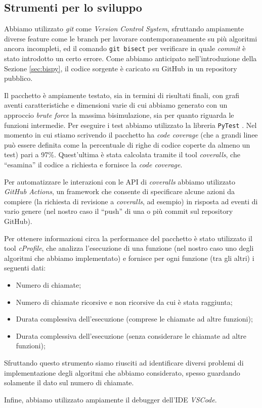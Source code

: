 \subsection{Strumenti per lo sviluppo}
Abbiamo utilizzato \emph{git} come \emph{Version Control System}, sfruttando ampiamente diverse feature come le branch per lavorare contemporaneamente su più algoritmi ancora incompleti, ed il comando \verb|git bisect| per verificare in quale \emph{commit} è stato introdotto un certo errore. Come abbiamo anticipato nell'introduzione della Sezione \ref{sec:bispy}, il codice sorgente è caricato su GitHub in un repository pubblico.

Il pacchetto è ampiamente testato, sia in termini di risultati finali, con grafi aventi caratteristiche e dimensioni varie di cui abbiamo generato con un approccio \emph{brute force} la massima bisimulazione, sia per quanto riguarda le funzioni intermedie. Per eseguire i test abbiamo utilizzato la libreria \texttt{PyTest} \cite{pytest}. Nel momento in cui stiamo scrivendo il pacchetto ha \emph{code coverage} (che a grandi linee può essere definita come la percentuale di righe di codice coperte da almeno un test) pari a 97\%. Quest'ultima è stata calcolata tramite il tool \emph{coveralls}, che ``esamina'' il codice a richiesta e fornisce la \emph{code coverage}.

Per automatizzare le interazioni con le API di \emph{coveralls} abbiamo utilizzato \emph{GitHub Actions}, un framework che consente di specificare alcune azioni da compiere (la richiesta di revisione a \emph{coveralls}, ad esempio) in risposta ad eventi di vario genere (nel nostro caso il ``push'' di una o più commit sul repository GitHub).

Per ottenere informazioni circa la performance del pacchetto è stato utilizzato il tool \emph{cProfile}, che analizza l'esecuzione di una funzione (nel nostro caso uno degli algoritmi che abbiamo implementato) e fornisce per ogni funzione (tra gli altri) i seguenti dati:
\begin{itemize}
    \item Numero di chiamate;
    \item Numero di chiamate ricorsive e non ricorsive da cui è stata raggiunta;
    \item Durata complessiva dell'esecuzione (comprese le chiamate ad altre funzioni);
    \item Durata complessiva dell'esecuzione (senza considerare le chiamate ad altre funzioni);
\end{itemize}
Sfruttando questo strumento siamo riusciti ad identificare diversi problemi di implementazione degli algoritmi che abbiamo considerato, spesso guardando solamente il dato sul numero di chiamate.

Infine, abbiamo utilizzato ampiamente il debugger dell'IDE \emph{VSCode}.
